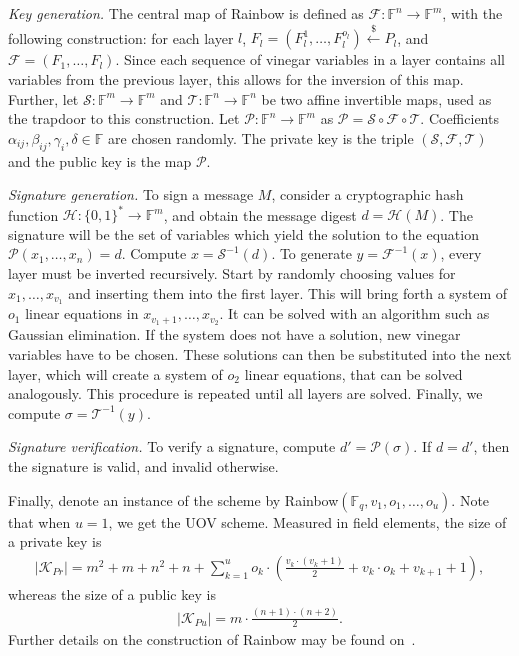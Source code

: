 \documentclass[openright, draft, 10pt]{report}
\newcommand{\random}{\stackrel{\$}{\longleftarrow}}
\begin{document}
\emph{Key generation.} The central map of Rainbow is defined as
$\mathcal{F} : \mathbb{F}^{n} \longrightarrow \mathbb{F}^{m}$, with the
following construction: for each layer $l$,
$F_{l} = (F_{l}^{1}, \dots, F_{l}^{o_{l}}) \random{} P_{l}$,
and $\mathcal{F} = (F_{1}, \dots, F_{l})$. Since each sequence of vinegar
variables in a layer contains all variables from the previous layer, this
allows for the inversion of this map. Further, let
$\mathcal{S} : \mathbb{F}^{m} \longrightarrow \mathbb{F}^{m}$ and
$\mathcal{T} : \mathbb{F}^{n} \longrightarrow \mathbb{F}^{n}$ be two affine
invertible maps, used as the trapdoor to this construction. Let
$\mathcal{P} : \mathbb{F}^{n} \longrightarrow \mathbb{F}^{m}$ as
$\mathcal{P} = \mathcal{S} \circ \mathcal{F} \circ \mathcal{T}$.
Coefficients $\alpha_{ij}, \beta_{ij}, \gamma_{i}, \delta \in \mathbb{F}$ are
chosen randomly. The private key is the triple
$(\mathcal{S}, \mathcal{F}, \mathcal{T})$ and the public key is the map
$\mathcal{P}$.

\emph{Signature generation.}
To sign a message $M$, consider a cryptographic hash function
$\mathcal{H} : {\{0, 1\}}^{*} \longrightarrow \mathbb{F}^{m}$, and obtain the
message digest $d = \mathcal{H}(M)$. The signature will be the set of variables
which yield the solution to the equation
$\mathcal{P}(x_{1}, \dots, x_{n}) = d$. Compute $x = \mathcal{S}^{-1}(d)$. To
generate $y = \mathcal{F}^{-1}(x)$, every layer must be inverted recursively.
Start by randomly choosing values for $x_{1}, \dots, x_{v_{1}}$ and inserting
them into the first layer. This will bring forth a system of $o_{1}$ linear
equations in $x_{v_{1} + 1}, \dots, x_{v_{2}}$. It can be solved with an
algorithm such as Gaussian elimination. If the system does not have a solution,
new vinegar variables have to be chosen. These solutions can then be
substituted into the next layer, which will create a system of $o_{2}$ linear
equations, that can be solved analogously. This procedure is repeated until all
layers are solved. Finally, we compute $\sigma = \mathcal{T}^{-1}(y)$.

\emph{Signature verification.}
To verify a signature, compute $d' = \mathcal{P}(\sigma)$. If $d = d'$, then
the signature is valid, and invalid otherwise.

Finally, denote an instance of the scheme by
Rainbow$(\mathbb{F}_{q}, v_{1}, o_{1}, \dots, o_{u})$. Note that when $u = 1$,
we get the UOV scheme. Measured in field elements, the size of a private key is
\begin{align}
  |\mathcal{K}_{Pr}| = m^{2} + m + n^{2} + n
    + \sum_{k = 1}^{u} o_{k} \cdot \left( \frac{v_{k} \cdot (v_{k} + 1)}{2}
      + v_{k} \cdot o_{k} + v_{k + 1} + 1 \right),
\end{align}
whereas the size of a public key is
\begin{align}
  |\mathcal{K}_{Pu}| = m \cdot \frac{(n + 1) \cdot (n + 2)}{2}.
\end{align}
Further details on the construction of Rainbow may be found
on~\cite[Section 3.3]{Ding:2006:book}.
\end{document}
